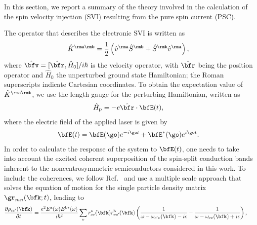 \documentclass[floatfix,prb,aps,superscriptaddress,showpacs,11pt,preprint,letterpaper]{revtex4}
\begin{document}


In this section, we report a summary of the theory  involved in the
calculation of the spin velocity
injection (SVI) resulting from the
pure spin current (PSC).
 
The operator that describes the electronic SVI is written as
\begin{align}\label{z.1}
\hat K^{\rma\rmb}=\frac{1}{2}\left( \hat v^\rma \hat S^\rmb 
+\hat  S^\rmb \hat v^\rma\right) 
,
\end{align} 
where $\hat\bfv=[\hat\bfr,\hat H_0]/i\hbar$ is the velocity operator, with
$\hat \bfr$ being the position operator and $\hat H_0$ the unperturbed
ground state Hamiltonian;
the Roman superscripts  indicate Cartesian coordinates. 
To obtain the expectation value of 
$\hat K^{\rma\rmb}$, we use the length gauge for the perturbing
Hamiltonian, written as
\begin{align}\label{z.2}
\hat H_{\text{p}}=-e\hat\bfr\cdot\bfE(t)
,
\end{align}   
where the electric field of the applied laser is given by
\begin{align}\label{z.3}
\bfE(t)= \bfE(\go)e^{-i\go t} + \bfE^*(\go)e^{i\go t}
.
\end{align}
In order to 
calculate the response of the system to $\bfE(t)$, one needs to
take into account the excited coherent superposition
of the spin-split conduction bands inherent to the 
noncentrosymmetric 
semiconductors considered in this work.
To include the coherences, we follow Ref.~ and
use a multiple
scale approach that solves the equation of motion for the single
particle density matrix $\gr_{mn}(\bfk;t)$, leading to
\begin{align}\label{z.4}
&\frac{\partial \rho_{cc'}(\bfk)}{\partial t} =
\frac{e^{2}E^{\mathrm{a}}(\omega)E^{\mathrm{b*}}(\omega)}
{i \hbar^{2}}
\sum_{v}r^{\mathrm{a}}_{cv}(\bfk) r^{\mathrm{b}}_{vc'}(\bfk)
\left( \frac{1}{\omega - \omega_{c'v}(\bfk) - i \epsilon} 
- 
\frac{1}{\omega - \omega_{cv}(\bfk) + i \epsilon} \right)
,
\end{align}
\end{document}
